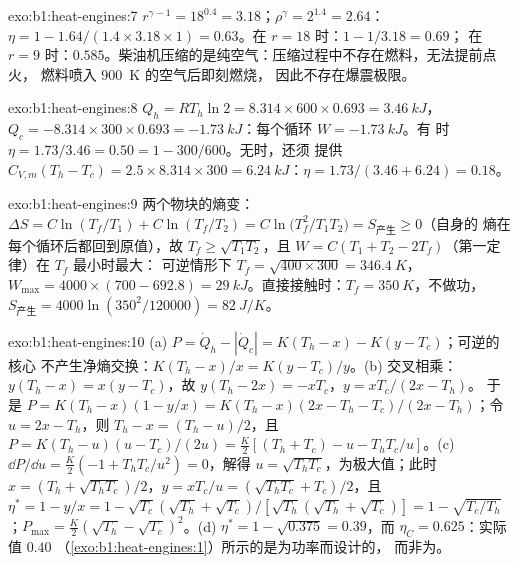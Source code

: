 \begin{solution}{exo:b1:heat-engines:7}
$r^{\gamma-1} = 18^{0.4} = 3.18$；$\rho^\gamma = 2^{1.4} = 2.64$：$\eta = 1 -
1.64/(1.4 \times 3.18 \times 1) = 0.63$。在 $r = 18$ 时：$1 - 1/3.18 = 0.69$；
在 $r = 9$ 时：$0.585$。柴油机压缩的是纯空气：压缩过程中不存在燃料，无法提前点火，
燃料喷入 \qty{900}{K} 的空气后即刻燃烧，
因此不存在爆震极限。
\end{solution}

\begin{solution}{exo:b1:heat-engines:8}
$Q_h = RT_h\ln2 = 8.314 \times 600 \times 0.693 = \qty{3.46}{kJ}$，$Q_c = -8.314
\times 300 \times 0.693 = \qty{-1.73}{kJ}$：每个循环 $W = \qty{-1.73}{kJ}$。有
时 $\eta = 1.73/3.46 = 0.50 = 1 - 300/600$。无时，还须
提供 $C_{V,m}(T_h - T_c) = 2.5 \times 8.314 \times 300 =
\qty{6.24}{kJ}$：$\eta = 1.73/(3.46 + 6.24) = 0.18$。
\end{solution}

\begin{solution}{exo:b1:heat-engines:9}
两个物块的熵变：$\Delta S = C\ln(T_f/T_1) + C\ln(T_f/T_2) =
C\ln\bigl(T_f^2/T_1T_2\bigr) = S_{\text{产生}} \geq 0$（自身的
熵在每个循环后都回到原值），故 $T_f \geq \sqrt{T_1T_2}$，且
$W = C(T_1 + T_2 - 2T_f)$（第一定律）在 $T_f$ 最小时最大：
可逆情形下 $T_f = \sqrt{400 \times 300} = \qty{346.4}{K}$，
$W_{\max} = 4000 \times (700 - 692.8) = \qty{29}{kJ}$。直接接触时：$T_f =
\qty{350}{K}$，不做功，$S_{\text{产生}} = 4000\ln(350^2/120000) =
\qty{82}{J/K}$。
\end{solution}

\begin{solution}{exo:b1:heat-engines:10}
(a) $P = \dot Q_h - |\dot Q_c| = K(T_h - x) - K(y - T_c)$；可逆的核心
不产生净熵交换：$K(T_h - x)/x = K(y - T_c)/y$。(b) 交叉相乘：
$y(T_h - x) = x(y - T_c)$，故 $y(T_h - 2x) = -xT_c$，$y = xT_c/(2x - T_h)$。
于是 $P = K(T_h - x)(1 - y/x) = K(T_h - x)(2x - T_h - T_c)/(2x - T_h)$；令
$u = 2x - T_h$，则 $T_h - x = (T_h - u)/2$，且 $P = K(T_h - u)(u - T_c)/(2u) =
\tfrac{K}{2}[(T_h + T_c) - u - T_hT_c/u]$。(c) $\dd P/\dd u = \tfrac K2(-1 +
T_hT_c/u^2) = 0$，解得 $u = \sqrt{T_hT_c}$，为极大值；此时 $x = (T_h +
\sqrt{T_hT_c})/2$，$y = xT_c/u = (\sqrt{T_hT_c} + T_c)/2$，且 $\eta^\ast = 1 - y/x
= 1 - \sqrt{T_c}(\sqrt{T_h} + \sqrt{T_c})/[\sqrt{T_h}(\sqrt{T_h} + \sqrt{T_c})] = 1 -
\sqrt{T_c/T_h}$；$P_{\max} = \tfrac K2(\sqrt{T_h} - \sqrt{T_c})^2$。(d)
$\eta^\ast = 1 - \sqrt{0.375} = 0.39$，而 $\eta_C = 0.625$：实际值 $0.40$
（\cref{exo:b1:heat-engines:1}）所示的是为功率而设计的，
而非为。
\end{solution}

